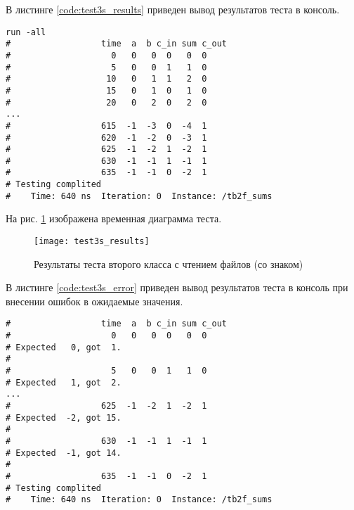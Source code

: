 \begin{multicols}{2}
		
	
\end{multicols}

В листинге \ref{code:test3s_results} приведен вывод результатов теста в консоль.
\begin{lstlisting}[caption=Результаты теста второго класса с чтением файлов (без знака), label=code:test3s_results, style=console]
run -all
# 		           time  a  b c_in sum c_out
#                    0   0   0  0   0  0
#                    5   0   0  1   1  0
#                   10   0   1  1   2  0
#                   15   0   1  0   1  0
#                   20   0   2  0   2  0
...
#                  615  -1  -3  0  -4  1
#                  620  -1  -2  0  -3  1
#                  625  -1  -2  1  -2  1
#                  630  -1  -1  1  -1  1
#                  635  -1  -1  0  -2  1
# Testing complited
#    Time: 640 ns  Iteration: 0  Instance: /tb2f_sums
\end{lstlisting}

На рис. \ref{fig:test3s_results} изображена временная диаграмма теста.
\begin{figure}[H]
	\begin{center}
		\texttt{[image: test3s\_results]}
		\caption{Результаты теста второго класса с чтением файлов (со знаком)}
		\label{fig:test3s_results}
	\end{center}
\end{figure}

В листинге \ref{code:test3s_error} приведен вывод результатов теста в консоль при внесении ошибок в ожидаемые значения.
\begin{lstlisting}[caption=Результаты ошибочного теста второго класса с чтением файлов, label=code:test3s_error, style=console]
# 		           time  a  b c_in sum c_out
#                    0   0   0  0   0  0
# Expected   0, got  1.
# 
#                    5   0   0  1   1  0
# Expected   1, got  2.
...
#                  625  -1  -2  1  -2  1
# Expected  -2, got 15.
# 
#                  630  -1  -1  1  -1  1
# Expected  -1, got 14.
# 
#                  635  -1  -1  0  -2  1
# Testing complited
#    Time: 640 ns  Iteration: 0  Instance: /tb2f_sums
\end{lstlisting}

\newpage

